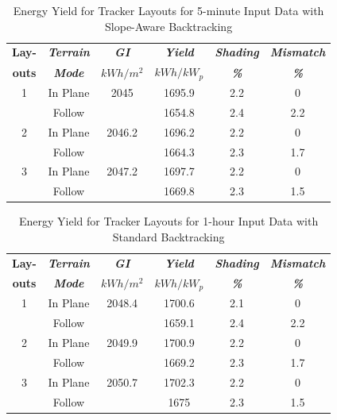 \documentclass[conference]{IEEEtran}
\begin{document}
\begin{table}[htbp]
\caption{Energy Yield for Tracker Layouts for 5-minute Input Data with Slope-Aware Backtracking}
\begin{center}
\begin{tabular}{|c|c|c|c|c|c|}
\hline
\textbf{Lay-}& \textbf{\textit{Terrain}}& \textbf{\textit{GI}}&        \textbf{\textit{Yield}}&        \textbf{\textit{Shading}}& \textbf{\textit{Mismatch}} \\
\textbf{outs}& \textbf{\textit{Mode}}&    \textbf{\textit{$kWh/m^2$}}& \textbf{\textit{$kWh / kW_p$}}& \textbf{\textit{\%}}&      \textbf{\textit{\%}} \\
\hline
1& In Plane& 2045&    1695.9& 2.2& 0 \\
 & Follow&       &    1654.8& 2.4& 2.2 \\
\hline
2& In Plane& 2046.2&  1696.2& 2.2& 0 \\
 & Follow&         &  1664.3& 2.3& 1.7 \\
\hline
3& In Plane& 2047.2&  1697.7& 2.2& 0 \\
 & Follow&         &  1669.8& 2.3& 1.5 \\
\hline
\end{tabular}
\label{table:slope-5min}
\end{center}
\end{table}

\begin{table}[htbp]
\caption{Energy Yield for Tracker Layouts for 1-hour Input Data with Standard Backtracking}
\begin{center}
\begin{tabular}{|c|c|c|c|c|c|}
\hline
\textbf{Lay-}& \textbf{\textit{Terrain}}& \textbf{\textit{GI}}&        \textbf{\textit{Yield}}&        \textbf{\textit{Shading}}& \textbf{\textit{Mismatch}} \\
\textbf{outs}& \textbf{\textit{Mode}}&    \textbf{\textit{$kWh/m^2$}}& \textbf{\textit{$kWh / kW_p$}}& \textbf{\textit{\%}}&      \textbf{\textit{\%}} \\
\hline
1& In Plane& 2048.4&  1700.6& 2.1& 0 \\
 & Follow&         &  1659.1& 2.4& 2.2 \\
\hline
2& In Plane& 2049.9&  1700.9& 2.2& 0 \\
 & Follow&         &  1669.2& 2.3& 1.7 \\
\hline
3& In Plane& 2050.7&  1702.3& 2.2& 0 \\
 & Follow&         &  1675&   2.3& 1.5 \\
\hline
\end{tabular}
\label{table:standard-1hr}
\end{center}
\end{table}
\end{document}
